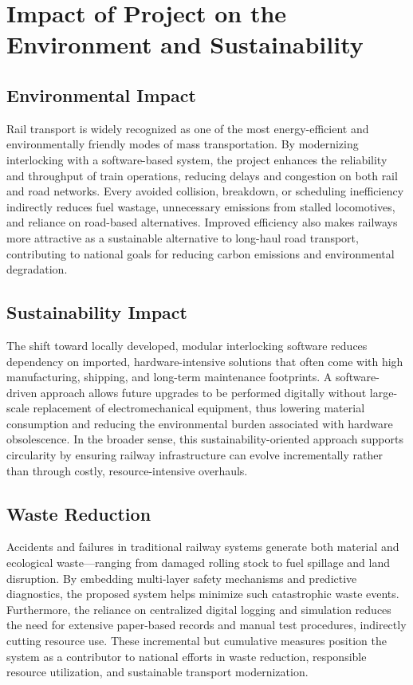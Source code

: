 \section{Impact of Project on the Environment and Sustainability}
\label{sec:outro:environment}

\subsection{Environmental Impact}
Rail transport is widely recognized as one of the most energy-efficient and environmentally friendly modes of mass transportation. By modernizing interlocking with a software-based system, the project enhances the reliability and throughput of train operations, reducing delays and congestion on both rail and road networks. Every avoided collision, breakdown, or scheduling inefficiency indirectly reduces fuel wastage, unnecessary emissions from stalled locomotives, and reliance on road-based alternatives. Improved efficiency also makes railways more attractive as a sustainable alternative to long-haul road transport, contributing to national goals for reducing carbon emissions and environmental degradation.

\subsection{Sustainability Impact}
The shift toward locally developed, modular interlocking software reduces dependency on imported, hardware-intensive solutions that often come with high manufacturing, shipping, and long-term maintenance footprints. A software-driven approach allows future upgrades to be performed digitally without large-scale replacement of electromechanical equipment, thus lowering material consumption and reducing the environmental burden associated with hardware obsolescence. In the broader sense, this sustainability-oriented approach supports circularity by ensuring railway infrastructure can evolve incrementally rather than through costly, resource-intensive overhauls.

\subsection{Waste Reduction}
Accidents and failures in traditional railway systems generate both material and ecological waste—ranging from damaged rolling stock to fuel spillage and land disruption. By embedding multi-layer safety mechanisms and predictive diagnostics, the proposed system helps minimize such catastrophic waste events. Furthermore, the reliance on centralized digital logging and simulation reduces the need for extensive paper-based records and manual test procedures, indirectly cutting resource use. These incremental but cumulative measures position the system as a contributor to national efforts in waste reduction, responsible resource utilization, and sustainable transport modernization.